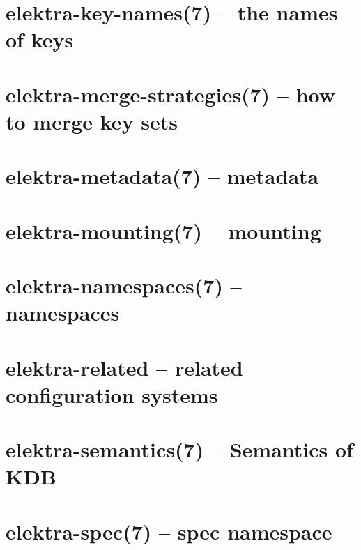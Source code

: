 \let\mypdfximage\pdfximage\def\pdfximage{\immediate\mypdfximage}\documentclass[twoside]{book}
\newcommand{\+}{\discretionary{\mbox{\scriptsize$\hookleftarrow$}}{}{}}
\begin{document}
\chapter{elektra-\/key-\/names(7) -- the names of keys}
\label{doc_help_elektra-key-names_md}

\chapter{elektra-\/merge-\/strategies(7) -- how to merge key sets}
\label{doc_help_elektra-merge-strategy_md}

\chapter{elektra-\/metadata(7) -- metadata}
\label{doc_help_elektra-metadata_md}

\chapter{elektra-\/mounting(7) -- mounting}
\label{doc_help_elektra-mounting_md}

\chapter{elektra-\/namespaces(7) -- namespaces}
\label{doc_help_elektra-namespaces_md}

\chapter{elektra-\/related -- related configuration systems}
\label{doc_help_elektra-related_md}

\chapter{elektra-\/semantics(7) -- Semantics of KDB}
\label{doc_help_elektra-semantics_md}

\chapter{elektra-\/spec(7) -- spec namespace}
\label{doc_help_elektra-spec_md}

\end{document}
